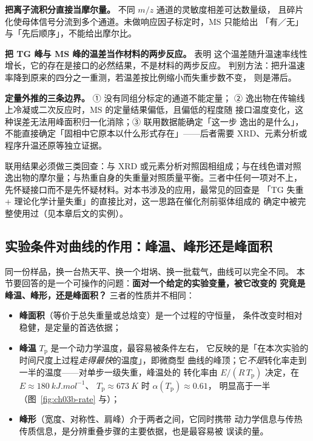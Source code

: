 \begin{pitfall}
\textbf{把离子流积分直接当摩尔量。} 不同 $m/z$ 通道的灵敏度相差可达数量级，
且碎片化使母体信号分流到多个通道。未做响应因子标定时，MS 只能给出
「有／无」与「先后顺序」，不能给出摩尔比。

\textbf{把 TG 峰与 MS 峰的温差当作材料的两步反应。}  表明
这个温差随升温速率线性增长，它的存在是接口的必然结果，不是材料的两步反应。
判别方法：把升温速率降到原来的四分之一重测，若温差按比例缩小而失重步数不变，
则是滞后。

\textbf{定量外推的三条边界。} ① 没有同组分标定的通道不能定量；
② 逸出物在传输线上冷凝或二次反应时，MS 的定量结果偏低，且偏低的程度随
接口温度变化，这种误差无法用峰面积归一化消除；③ 联用数据能确定「这一步
逸出的是什么」，不能直接确定「固相中它原本以什么形式存在」——后者需要
XRD、元素分析或程序升温还原等独立证据。
\end{pitfall}

\begin{crosscheck}
联用结果必须做三类回查：与 XRD 或元素分析对照固相组成；与在线色谱对照
逸出物的摩尔量；与热重自身的失重量对照质量平衡。三者中任何一项对不上，
先怀疑接口而不是先怀疑材料。对本书涉及的应用，最常见的回查是
「TG 失重 + 理论化学计量失重」的直接比对，这一思路在催化剂前驱体组成的
确定中被完整使用过（见本章后文的实例）。
\end{crosscheck}

\subsection{实验条件对曲线的作用：峰温、峰形还是峰面积}

\begin{probout}
同一份样品，换一台热天平、换一个坩埚、换一批载气，曲线可以完全不同。
本节要回答的是一个可操作的问题：\textbf{面对一个给定的实验变量，被它改变的
究竟是峰温、峰形，还是峰面积？} 三者的性质并不相同：

\begin{itemize}
  \item \textbf{峰面积}（等价于总失重量或总焓变）是一个过程的守恒量，
  条件改变时相对稳健，是定量的首选依据；
  \item \textbf{峰温} $T_{\mathrm p}$ 是一个动力学温度，最容易被条件左右，
  它反映的是「在本次实验的时间尺度上过程\emph{走得最快}的温度」，即微商型
  曲线的峰顶；它\emph{不是}转化率走到一半的温度——对单步一级失重，峰温处的
  转化率由 $E/(R\,T_{\mathrm p})$ 决定，在 $E\approx\qty{180}{kJ.mol^{-1}}$、
  $T_{\mathrm p}\approx\qty{673}{K}$ 时 $\alpha(T_{\mathrm p})\approx0.61$，
  明显高于一半（图~\ref{fig:ch03b-rate} 与）；
  \item \textbf{峰形}（宽度、对称性、肩峰）介于两者之间，它同时携带
  动力学信息与传热传质信息，是分辨重叠步骤的主要依据，也是最容易被
  误读的量。
\end{itemize}
\end{probout}

